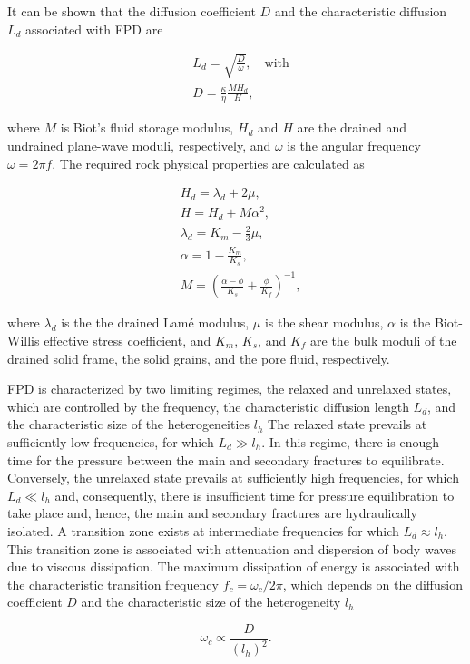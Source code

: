 \documentclass[draft]{agujournal2019}
\begin{document}
It can be shown that the diffusion coefficient $D$ and the characteristic diffusion $L_d$ associated with FPD are \cite{Chandler1981, Norris1993}
\begin{linenomath*}
\begin{equation}\label{Eq.3}
\begin{split}
&L_d=\sqrt{\frac{D}{\omega}},\quad \text{with} \\
&D= \frac {\kappa} {\eta} \frac{M H_d}{H},
\end{split}
\end{equation}
\end{linenomath*}
where $M$ is Biot’s fluid storage modulus, $H_d$ and $H$ are the drained and undrained plane-wave moduli, respectively, and $\omega$ is the angular frequency $\omega = 2 \pi f$.        
The required rock physical properties are calculated as
\begin{linenomath*}
\begin{equation}\label{Eq.4}
\begin{split}
& H_d = \lambda_d + 2 \mu, \\
& H = H_d + M \alpha ^2, \\
& \lambda_d= K_m - \frac{2}{3} \mu, \\
& \alpha =1-\frac{K_m}{K_s},\\
& M  =\left( \frac{\alpha-\phi}{K_s} +\frac{\phi}{K_f} \right)^{-1},
\end{split}
\end{equation}
\end{linenomath*}
where $\lambda_d$ is the the drained Lamé modulus, $\mu$ is the shear modulus, $\alpha$ is the Biot-Willis effective stress coefficient, and  $K_m$, $K_s$, and $K_f$ are the bulk moduli of the drained solid frame, the solid grains, and the pore fluid, respectively.

FPD is characterized by two limiting regimes, the relaxed and unrelaxed states, which are controlled by the frequency, the characteristic diffusion length $L_d$, and the characteristic size of the heterogeneities $l_h$ 
The relaxed state prevails at sufficiently low frequencies, for which  $L_d \gg l_h$. In this regime, there is enough time for the pressure between the main and secondary fractures to equilibrate. Conversely, the unrelaxed state prevails at sufficiently high frequencies, for which $L_d \ll l_h$ and, consequently, there is insufficient time for pressure equilibration to take place and, hence, the main and secondary fractures are hydraulically isolated. A transition zone exists at intermediate frequencies for which $L_d \approx l_h$. This transition zone is associated with attenuation and dispersion of body waves due to viscous dissipation. The maximum dissipation of energy is associated with the characteristic transition frequency $f_c= \omega_c/2\pi$, 
which depends on the diffusion coefficient $D$ and the characteristic size of the heterogeneity $l_h$ \cite{Rubino2014}
\begin{linenomath*}
\begin{equation}\label{Eq.5}
\omega_c \propto \frac{D}{(l_h)^2}.
\end{equation}
\end{linenomath*}
\end{document}
